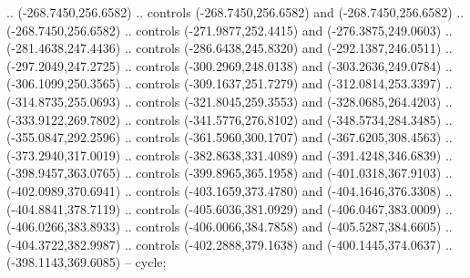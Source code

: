 \begin{scope}[shift={(407.03862,-246.29561)}]
    .. (-268.7450,256.6582) .. controls (-268.7450,256.6582) and
    (-268.7450,256.6582) .. (-268.7450,256.6582) .. controls (-271.9877,252.4415)
    and (-276.3875,249.0603) .. (-281.4638,247.4436) .. controls
    (-286.6438,245.8320) and (-292.1387,246.0511) .. (-297.2049,247.2725) ..
    controls (-300.2969,248.0138) and (-303.2636,249.0784) .. (-306.1099,250.3565)
    .. controls (-309.1637,251.7279) and (-312.0814,253.3397) ..
    (-314.8735,255.0693) .. controls (-321.8045,259.3553) and (-328.0685,264.4203)
    .. (-333.9122,269.7802) .. controls (-341.5776,276.8102) and
    (-348.5734,284.3485) .. (-355.0847,292.2596) .. controls (-361.5960,300.1707)
    and (-367.6205,308.4563) .. (-373.2940,317.0019) .. controls
    (-382.8638,331.4089) and (-391.4248,346.6839) .. (-398.9457,363.0765) ..
    controls (-399.8965,365.1958) and (-401.0318,367.9103) .. (-402.0989,370.6941)
    .. controls (-403.1659,373.4780) and (-404.1646,376.3308) ..
    (-404.8841,378.7119) .. controls (-405.6036,381.0929) and (-406.0467,383.0009)
    .. (-406.0266,383.8933) .. controls (-406.0066,384.7858) and
    (-405.5287,384.6605) .. (-404.3722,382.9987) .. controls (-402.2888,379.1638)
    and (-400.1445,374.0637) .. (-398.1143,369.6085) -- cycle;


\end{scope}
